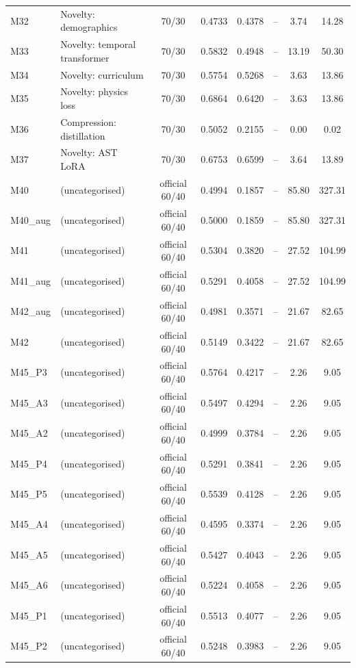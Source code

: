 \begin{table}[htbp]
\begin{tabular}{llcccccc}
M32 & Novelty: demographics & 70/30 & 0.4733 & 0.4378 & -- & 3.74 & 14.28 \\
M33 & Novelty: temporal transformer & 70/30 & 0.5832 & 0.4948 & -- & 13.19 & 50.30 \\
M34 & Novelty: curriculum & 70/30 & 0.5754 & 0.5268 & -- & 3.63 & 13.86 \\
M35 & Novelty: physics loss & 70/30 & 0.6864 & 0.6420 & -- & 3.63 & 13.86 \\
M36 & Compression: distillation & 70/30 & 0.5052 & 0.2155 & -- & 0.00 & 0.02 \\
M37 & Novelty: AST LoRA & 70/30 & 0.6753 & 0.6599 & -- & 3.64 & 13.89 \\
M40 & (uncategorised) & official 60/40 & 0.4994 & 0.1857 & -- & 85.80 & 327.31 \\
M40\_aug & (uncategorised) & official 60/40 & 0.5000 & 0.1859 & -- & 85.80 & 327.31 \\
M41 & (uncategorised) & official 60/40 & 0.5304 & 0.3820 & -- & 27.52 & 104.99 \\
M41\_aug & (uncategorised) & official 60/40 & 0.5291 & 0.4058 & -- & 27.52 & 104.99 \\
M42\_aug & (uncategorised) & official 60/40 & 0.4981 & 0.3571 & -- & 21.67 & 82.65 \\
M42 & (uncategorised) & official 60/40 & 0.5149 & 0.3422 & -- & 21.67 & 82.65 \\
M45\_P3 & (uncategorised) & official 60/40 & 0.5764 & 0.4217 & -- & 2.26 & 9.05 \\
M45\_A3 & (uncategorised) & official 60/40 & 0.5497 & 0.4294 & -- & 2.26 & 9.05 \\
M45\_A2 & (uncategorised) & official 60/40 & 0.4999 & 0.3784 & -- & 2.26 & 9.05 \\
M45\_P4 & (uncategorised) & official 60/40 & 0.5291 & 0.3841 & -- & 2.26 & 9.05 \\
M45\_P5 & (uncategorised) & official 60/40 & 0.5539 & 0.4128 & -- & 2.26 & 9.05 \\
M45\_A4 & (uncategorised) & official 60/40 & 0.4595 & 0.3374 & -- & 2.26 & 9.05 \\
M45\_A5 & (uncategorised) & official 60/40 & 0.5427 & 0.4043 & -- & 2.26 & 9.05 \\
M45\_A6 & (uncategorised) & official 60/40 & 0.5224 & 0.4058 & -- & 2.26 & 9.05 \\
M45\_P1 & (uncategorised) & official 60/40 & 0.5513 & 0.4077 & -- & 2.26 & 9.05 \\
M45\_P2 & (uncategorised) & official 60/40 & 0.5248 & 0.3983 & -- & 2.26 & 9.05 \\
\hline
\end{tabular}
\end{table}

